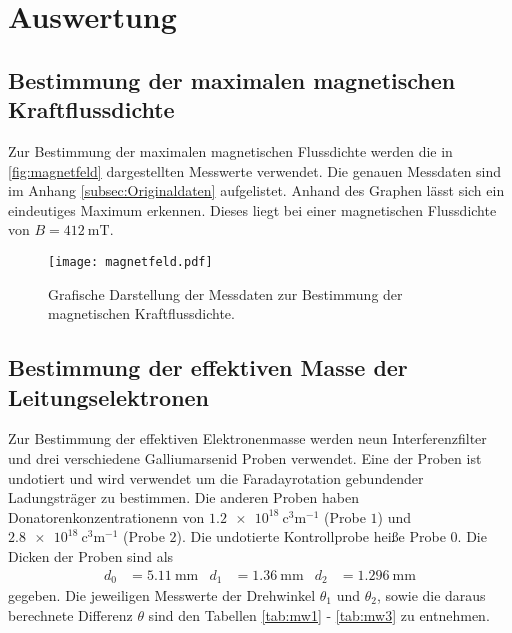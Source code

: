 \section{Auswertung}
\label{sec:Auswertung}

\subsection{Bestimmung der maximalen magnetischen Kraftflussdichte}
Zur Bestimmung der maximalen magnetischen Flussdichte werden die in \autoref{fig:magnetfeld} dargestellten Messwerte verwendet. Die genauen Messdaten sind im Anhang
\ref{subsec:Originaldaten} aufgelistet. Anhand des Graphen lässt sich ein eindeutiges Maximum erkennen. Dieses liegt bei einer magnetischen Flussdichte von 
$B = \qty{412}{\milli\tesla}$.

\begin{figure}
  \centering
  \texttt{[image: magnetfeld.pdf]}
  \caption{Grafische Darstellung der Messdaten zur Bestimmung der magnetischen Kraftflussdichte.}
  \label{fig:magnetfeld}
\end{figure}

\subsection{Bestimmung der effektiven Masse der Leitungselektronen}
\label{subsec:Elektronenmasse}
Zur Bestimmung der effektiven Elektronenmasse werden neun Interferenzfilter und drei verschiedene Galliumarsenid Proben verwendet. Eine der Proben ist undotiert und wird verwendet 
um die Faradayrotation gebundender Ladungsträger zu bestimmen. Die anderen Proben haben Donatorenkonzentrationenn von $\qty{1.2e18}{\cubic\centi\metre^{-1}}$ (Probe $1$) und 
$\qty{2.8e18}{\cubic\centi\metre^{-1}}$ (Probe $2$). Die undotierte Kontrollprobe heiße Probe $0$.
Die Dicken der Proben sind als
\begin{align*}
  d_0 &= \qty{5.11}{\milli\metre} & d_1 &= \qty{1.36}{\milli\metre} & d_2 &= \qty{1.296}{\milli\metre}
\end{align*}
gegeben. Die jeweiligen Messwerte der Drehwinkel $\theta_1$ und $\theta_2$, sowie die daraus berechnete Differenz $\theta$ sind den Tabellen 
\ref{tab:mw1} - \ref{tab:mw3} zu entnehmen.

